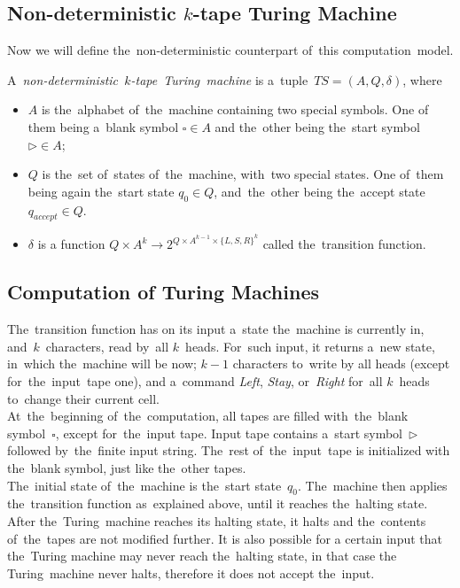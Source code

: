 \subsection{Non-deterministic $k$-tape Turing Machine}
Now we will define the~non-deterministic counterpart of~this computation~model.
\begin{definition}
    A~\emph{non-deterministic~$k$-tape~Turing~machine} is a~tuple~${TS = (A, Q, \delta)}$, where
    \begin{itemize}
        \item $A$ is the~alphabet of~the~machine containing two special symbols. One of them being a~blank symbol $\square \in A$ and the~other being the~start symbol $\triangleright \in A$;
        \item $Q$ is the~set of~states of~the~machine, with~two special states. One of~them being again the~start state $q_0 \in Q$, and~the~other being the~accept state $q_{accept} \in Q$.
        \item $\delta$ is a function ${Q \times A^k \rightarrow 2^{Q \times A^{k-1} \times \{L, S, R\}^k}}$ called the~transition function.
    \end{itemize}
\end{definition}

\subsection{Computation of Turing Machines}
The~transition function has on its input a~state the~machine is currently in, and~$k$~characters, read by~all $k$~heads. For~such input, it returns a~new state, in~which the~machine will be now; $k - 1$ characters to~write by all heads (except for~the~input~tape one), and a~command \textit{Left}, \textit{Stay}, or~\textit{Right} for~all $k$~heads to~change their current cell. \\
At~the~beginning of~the~computation, all tapes are filled with~the~blank symbol~$\square$, except for~the~input tape. Input tape contains a~start symbol~$\triangleright$ followed by~the~finite input string. The~rest of~the~input~tape is initialized with the~blank symbol, just like the~other tapes.\\
The~initial state of~the~machine is the~start state~$q_0$. The~machine then applies the~transition function as~explained above, until it reaches the~halting state. After the~Turing~machine reaches its halting state, it halts and the~contents of~the~tapes are not modified further. It is also possible for a certain input that the~Turing machine may never reach the~halting state, in that case the Turing~machine never halts, therefore it does not accept the~input.
